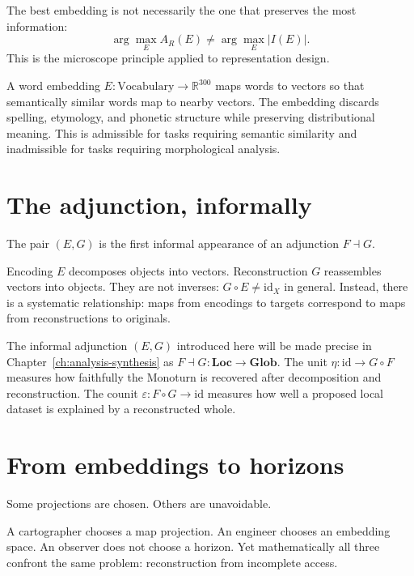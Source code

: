 The best embedding is not necessarily the one that preserves
the most information:
\[
  \arg\max_E A_R(E)
  \neq
  \arg\max_E |I(E)|.
\]
This is the microscope principle applied to representation
design.

\begin{example}
  A word embedding $E : \mathrm{Vocabulary} \to \mathbb{R}^{300}$
  maps words to vectors so that semantically similar words
  map to nearby vectors.
  The embedding discards spelling, etymology, and phonetic
  structure while preserving distributional meaning.
  This is admissible for tasks requiring semantic similarity
  and inadmissible for tasks requiring morphological analysis.
\end{example}

\section{The adjunction, informally}

The pair $(E, G)$ is the first informal appearance of an
adjunction $F \dashv G$.

Encoding $E$ decomposes objects into vectors.
Reconstruction $G$ reassembles vectors into objects.
They are not inverses: $G \circ E \neq \mathrm{id}_X$ in
general.
Instead, there is a systematic relationship: maps from encodings
to targets correspond to maps from reconstructions to originals.

\begin{ForwardRef}
  The informal adjunction $(E, G)$ introduced here will be
  made precise in Chapter~\ref{ch:analysis-synthesis} as
  $F \dashv G : \mathbf{Loc} \to \mathbf{Glob}$.
  The unit $\eta : \mathrm{id} \to G \circ F$ measures
  how faithfully the Monoturn is recovered after decomposition
  and reconstruction.
  The counit $\varepsilon : F \circ G \to \mathrm{id}$
  measures how well a proposed local dataset is explained by
  a reconstructed whole.
\end{ForwardRef}

\section{From embeddings to horizons}

Some projections are chosen. Others are unavoidable.

A cartographer chooses a map projection.
An engineer chooses an embedding space.
An observer does not choose a horizon.
Yet mathematically all three confront the same problem:
reconstruction from incomplete access.

